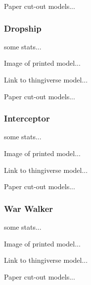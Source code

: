 \documentclass{article}
\begin{document}
Paper cut-out models...

\subsubsection{Dropship}

some stats...

Image of printed model...

Link to thingiverse model...

Paper cut-out models...

\subsubsection{Interceptor}

some stats...

Image of printed model...

Link to thingiverse model...

Paper cut-out models...

\subsubsection{War Walker}

some stats...

Image of printed model...

Link to thingiverse model...

Paper cut-out models...
\end{document}
